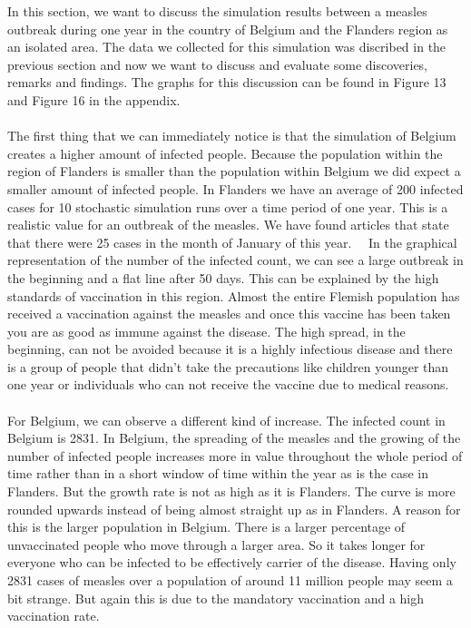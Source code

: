 \documentclass[runningheads]{llncs}
\begin{document}
	In this section, we want to discuss the simulation results between a measles outbreak during one year in the country of Belgium and the Flanders region as an isolated area. The data we collected for this simulation was discribed in the previous section and now we want to discuss and evaluate some discoveries, remarks and findings. The graphs for this discussion can be found in Figure 13 and Figure 16 in the appendix.\\
	\noindent\\
	The first thing that we can immediately notice is that the simulation of Belgium creates a higher amount of infected people. Because the population within the region of Flanders is smaller than the population within Belgium we did expect a smaller amount of infected people. In Flanders we have an average of 200 infected cases for 10 stochastic simulation runs over a time period of one year. This is a realistic value for an outbreak of the measles. We have found articles that state that there were 25 cases in the month of January of this year.~\cite{18}~\cite{13} In the graphical representation of the number of the infected count, we can see a large outbreak in the beginning and a flat line after 50 days. This can be explained by the high standards of vaccination in this region. Almost the entire Flemish population has received a vaccination against the measles and once this vaccine has been taken you are as good as immune against the disease. The high spread, in the beginning, can not be avoided because it is a highly infectious disease and there is a group of people that didn't take the precautions like children younger than one year or individuals who can not receive the vaccine due to medical reasons.~\cite{20} \\
	\noindent\\
	For Belgium, we can observe a different kind of increase. The infected count in Belgium is 2831. In Belgium, the spreading of the measles and the growing of the number of infected people increases more in value throughout the whole period of time rather than in a short window of time within the year as is the case in Flanders. But the growth rate is not as high as it is Flanders. The curve is more rounded upwards instead of being almost straight up as in Flanders. A reason for this is the larger population in Belgium. There is a larger percentage of unvaccinated people who move through a larger area. So it takes longer for everyone who can be infected to be effectively carrier of the disease. Having only 2831 cases of measles over a population of around 11 million people may seem a bit strange. But again this is due to the mandatory vaccination and a high vaccination rate.\\
\end{document}
